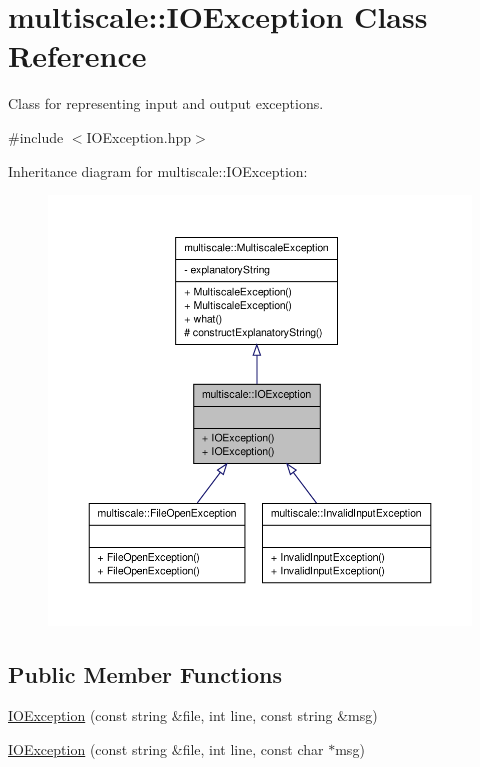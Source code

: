 \hypertarget{classmultiscale_1_1IOException}{\section{multiscale\-:\-:\-I\-O\-Exception \-Class \-Reference}
\label{classmultiscale_1_1IOException}
}


\-Class for representing input and output exceptions.  




{\ttfamily \#include $<$\-I\-O\-Exception.\-hpp$>$}



\-Inheritance diagram for multiscale\-:\-:\-I\-O\-Exception\-:\nopagebreak
\begin{figure}[H]
\begin{center}
\leavevmode
\includegraphics[width=350pt]{classmultiscale_1_1IOException__inherit__graph}
\end{center}
\end{figure}
\subsection*{\-Public \-Member \-Functions}
\begin{DoxyCompactItemize}
\item 
\hyperlink{classmultiscale_1_1IOException_a081bb2e4c214a18cbace0d93e1b60488}{\-I\-O\-Exception} (const string \&file, int line, const string \&msg)
\item 
\hyperlink{classmultiscale_1_1IOException_a2ccacf8690ac56b07af15da7fa7bb93a}{\-I\-O\-Exception} (const string \&file, int line, const char $\ast$msg)
\end{DoxyCompactItemize}


